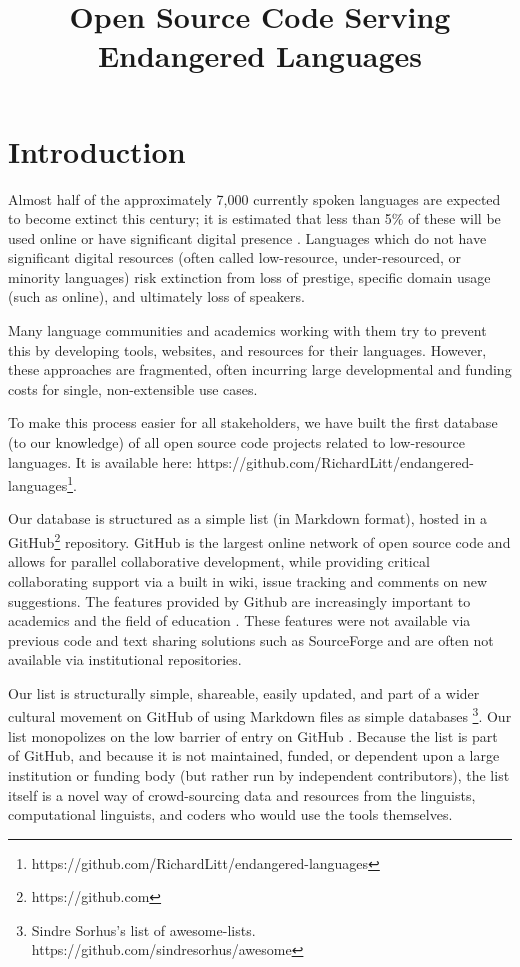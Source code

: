 \documentclass[10pt, a4paper]{article}
\title{Open Source Code Serving Endangered Languages}
\begin{document}
\maketitleabstract

\section{Introduction}

Almost half of the approximately 7,000 currently spoken languages are expected to
become extinct this century; it is estimated that less than 5\% of these will be used online or have significant digital presence \cite{kornai2013digital}. Languages which do not have significant digital resources (often called low-resource, under-resourced, or minority languages) risk extinction from loss of prestige, specific domain usage (such as online), and ultimately loss of speakers.

Many language communities and academics working with them try to prevent this by developing
tools, websites, and resources for their languages. However, these approaches are fragmented,
often incurring large developmental and funding costs for single, non-extensible use cases. 

To make this process easier for all stakeholders, we have built the first database (to our knowledge) of all open source code projects related to low-resource languages. It is available here: https://github.com/RichardLitt/endangered-languages\footnote{https://github.com/RichardLitt/endangered-languages}.

Our database is structured as a simple list (in Markdown format), hosted in a GitHub\footnote{https://github.com} repository. GitHub is the largest online network of open source code and allows for parallel collaborative development, while providing critical collaborating support via a built in wiki, issue tracking and comments on new suggestions. The features provided by Github are increasingly important to academics and the field of education \cite{zagalsky2015}. These features were not available via previous code and text sharing solutions such as SourceForge and are often not available via institutional repositories. 

Our list is structurally simple, shareable, easily updated, and part of a wider cultural movement on GitHub of using Markdown files as simple databases \footnote{Sindre Sorhus's list of awesome-lists. https://github.com/sindresorhus/awesome}. Our list monopolizes on the low barrier of entry on GitHub \cite{storey2014}. Because the list is part of GitHub, and because it is not maintained, funded, or dependent upon a large institution or funding body (but rather run by independent contributors), the list itself is a novel way of crowd-sourcing data and resources from the linguists, computational linguists, and coders who would use the tools themselves. 
\end{document}
